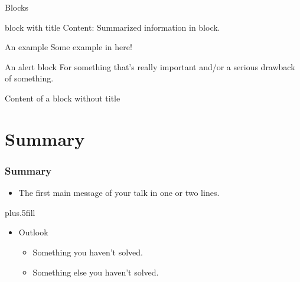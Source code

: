 \documentclass[pdftex]{beamer}
\begin{document}
\begin{frame}{Blocks}
  \begin{block}{block with title}
    Content: Summarized information in block. 
  \end{block}  
  \begin{exampleblock}{An example}
    Some example in here!
  \end{exampleblock}
  \begin{alertblock}{An alert block}
    For something that's really important and/or a serious drawback of something.
  \end{alertblock}
  \begin{block}{}
    Content of a block without title 
  \end{block}  
\end{frame}


\section*{Summary}

\begin{frame}
  \frametitle<presentation>{Summary}

  \begin{itemize}
  \item The \alert{first main message} of your talk in one or two lines.
  \end{itemize}

  \vskip0pt plus.5fill
  \begin{itemize}
  \item Outlook
    \begin{itemize}
    \item Something you haven't solved.
    \item Something else you haven't solved.
    \end{itemize}
  \end{itemize}
\end{frame}
\end{document}
